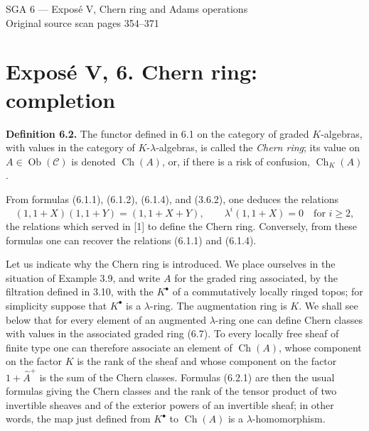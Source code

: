 \documentclass[11pt]{article}
\newcommand{\Gr}{\operatorname{Gr}}
\newcommand{\Fil}{\operatorname{Fil}}
\providecommand{\Gr}{\operatorname{Gr}}
\providecommand{\Gr}{\operatorname{G}}
\begin{document}
\providecommand{\Ghat}{\widehat G}
\providecommand{\Aqhat}{\widehat A_{\mathbb Q}}
\providecommand{\Ch}{\operatorname{Ch}}
\providecommand{\Log}{\operatorname{Log}}
\providecommand{\id}{\operatorname{id}}
\providecommand{\gr}{\operatorname{gr}}
\providecommand{\Hom}{\operatorname{Hom}}
\providecommand{\epsi}{\varepsilon}
\providecommand{\clgr}{\operatorname{cl}}
\providecommand{\Fil}{\operatorname{Fil}}
\providecommand{\Gr}{\operatorname{Gr}}
\providecommand{\Sym}{\operatorname{Sym}}

\begin{center}
{\Large SGA 6 — Exposé V, Chern ring and Adams operations}\\[0.4em]
{\large Original source scan pages 354--371}
\end{center}


\section*{Exposé V, 6. Chern ring: completion}

\textbf{Definition 6.2.} The functor defined in 6.1 on the category of graded \(K\)-algebras, with values in the category of \(K\)-\(\lambda\)-algebras, is called the \emph{Chern ring}; its value on \(A\in\operatorname{Ob}(\mathscr C)\) is denoted \(\Ch(A)\), or, if there is a risk of confusion, \(\Ch_K(A)\).

From formulas (6.1.1), (6.1.2), (6.1.4), and (3.6.2), one deduces the relations
\begin{equation}\tag{6.2.1}
 (1,1+X)(1,1+Y)=(1,1+X+Y),
 \qquad
 \lambda^i(1,1+X)=0\quad\text{for }i\ge2,
\end{equation}
the relations which served in [1] to define the Chern ring. Conversely, from these formulas one can recover the relations (6.1.1) and (6.1.4).

Let us indicate why the Chern ring is introduced. We place ourselves in the situation of Example 3.9, and write \(A\) for the graded ring associated, by the filtration defined in 3.10, with the \(K^\bullet\) of a commutatively locally ringed topos; for simplicity suppose that \(K^\bullet\) is a \(\lambda\)-ring. The augmentation ring is \(K\). We shall see below that for every element of an augmented \(\lambda\)-ring one can define Chern classes with values in the associated graded ring (6.7). To every locally free sheaf of finite type one can therefore associate an element of \(\Ch(A)\), whose component on the factor \(K\) is the rank of the sheaf and whose component on the factor \(1+\widehat A^+\) is the sum of the Chern classes. Formulas (6.2.1) are then the usual formulas giving the Chern classes and the rank of the tensor product of two invertible sheaves and of the exterior powers of an invertible sheaf; in other words, the map just defined from \(K^\bullet\) to \(\Ch(A)\) is a \(\lambda\)-homomorphism.
\end{document}
